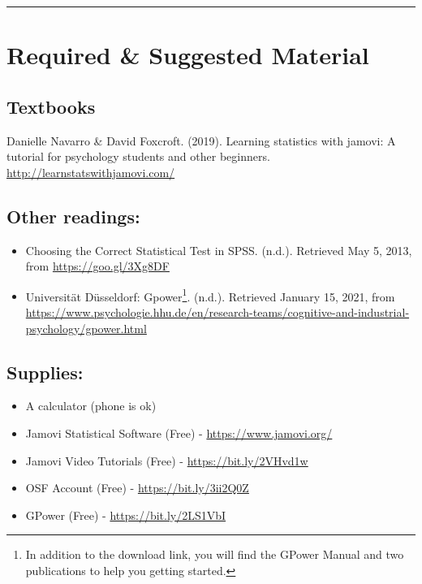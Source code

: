 \documentclass[11pt,]{article}
\providecommand{\tightlist}{%
  \setlength{\itemsep}{0pt}\setlength{\parskip}{0pt}}
\begin{document}
\begin{center}\rule{0.5\linewidth}{0.5pt}\end{center}

\hypertarget{required-suggested-material}{%
\section{Required \& Suggested
Material}\label{required-suggested-material}}

\hypertarget{textbook}{%
\subsection{Textbooks}\label{textbook}}

Danielle Navarro \& David Foxcroft. (2019). Learning statistics with
jamovi: A tutorial for psychology students and other beginners.
\url{http://learnstatswithjamovi.com/}

\hypertarget{other-readings}{%
\subsection{Other readings:}\label{other-readings}}

\begin{itemize}
\tightlist
\item
  Choosing the Correct Statistical Test in SPSS. (n.d.). Retrieved May
  5, 2013, from \url{https://goo.gl/3Xg8DF}
\item
  Universität Düsseldorf: Gpower\footnote{In addition to the download
    link, you will find the GPower Manual and two publications to help
    you getting started.}. (n.d.). Retrieved January 15, 2021, from
  \url{https://www.psychologie.hhu.de/en/research-teams/cognitive-and-industrial-psychology/gpower.html}
\end{itemize}

\hypertarget{supplies}{%
\subsection{Supplies:}\label{supplies}}

\begin{itemize}
\tightlist
\item
  A calculator (phone is ok)
\item
  Jamovi Statistical Software (Free) - \url{https://www.jamovi.org/}
\item
  Jamovi Video Tutorials (Free) - \url{https://bit.ly/2VHvd1w}
\item
  OSF Account (Free) - \url{https://bit.ly/3ii2Q0Z}
\item
  GPower (Free) - \url{https://bit.ly/2LS1VbI}
\end{itemize}
\end{document}

